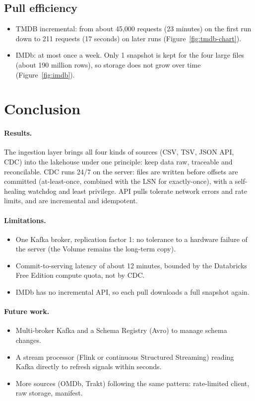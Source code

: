 \documentclass[12pt,a4paper]{article}
\begin{document}
\subsection{Pull efficiency}
\begin{itemize}
  \item TMDB incremental: from about 45,000 requests (23 minutes) on the first run down to 211 requests (17 seconds)
        on later runs (Figure~\ref{fig:tmdb-chart}).
  \item IMDb: at most once a week. Only 1 snapshot is kept for the four large files (about 190 million rows), so
        storage does not grow over time (Figure~\ref{fig:imdb}).
\end{itemize}

\section{Conclusion}

\paragraph{Results.} The ingestion layer brings all four kinds of sources (CSV, TSV, JSON API, CDC) into the lakehouse
under one principle: keep data raw, traceable and reconcilable. CDC runs 24/7 on the server: files are written before
offsets are committed (at-least-once, combined with the LSN for exactly-once), with a self-healing watchdog and least
privilege. API pulls tolerate network errors and rate limits, and are incremental and idempotent.

\paragraph{Limitations.}
\begin{itemize}
  \item One Kafka broker, replication factor 1: no tolerance to a hardware failure of the server (the Volume remains
        the long-term copy).
  \item Commit-to-serving latency of about 12 minutes, bounded by the Databricks Free Edition compute quota, not by CDC.
  \item IMDb has no incremental API, so each pull downloads a full snapshot again.
\end{itemize}

\paragraph{Future work.}
\begin{itemize}
  \item Multi-broker Kafka and a Schema Registry (Avro) to manage schema changes.
  \item A stream processor (Flink or continuous Structured Streaming) reading Kafka directly to refresh signals within
        seconds.
  \item More sources (OMDb, Trakt) following the same pattern: rate-limited client, raw storage, manifest.
\end{itemize}
\end{document}
